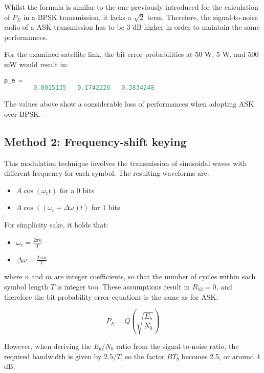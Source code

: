 Whilst the formula is similar to the one previously introduced for the calculation of $P_E$ in a BPSK transmission, it lacks a $\sqrt{2}$ term.
Therefore, the signal-to-noise radio of a ASK transmission has to be 3 dB higher in order to maintain the same performances.

For the examined satellite link, the bit error probabilities at 50 W, 5 W, and 500 mW would result in:

\begin{lstlisting}[language=Octave]
    p_e =
        0.0015135   0.1742226   0.3834248
\end{lstlisting}

The values above show a considerable loss of performances when adopting ASK over BPSK.


\subsection{Method 2: Frequency-shift keying}
This modulation technique involves the transmission of sinusoidal waves with different frequency for each symbol.
The resulting waveforms are:

\begin{itemize}
	\item $A\cos(\omega_c t)$ for a 0 bits
	\item $A\cos((\omega_c + \Delta\omega) t)$ for 1 bits
\end{itemize}

For simplicity sake, it holds that:

\begin{itemize}
	\item $ \omega_c = \frac{2 \pi n}{T} $
	\item $ \Delta\omega = \frac{2 \pi m}{T} $
\end{itemize}

where $n$ and $m$ are integer coefficients, so that the number of cycles within each symbol length $T$ is integer too.
These assumptions result in $R_{12} = 0$, and therefore the bit probability error equations is the same as for ASK:

\begin{equation}
	P_E = Q\left(\sqrt{\frac{E_b}{N_0}}\right)
\end{equation}

However, when deriving the $E_b / N_0$ ratio from the signal-to-noise ratio, the required bandwidth is given by $2.5 / T$, so the factor $B T_b$ becomes 2.5, or around 4 dB.


